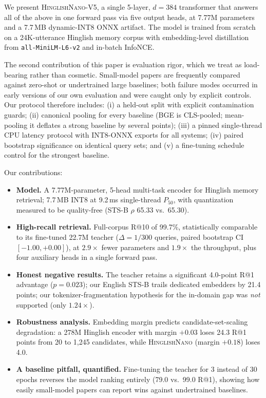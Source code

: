 \documentclass[11pt]{article}
\newcommand{\nano}{\textsc{HinglishNano}}
\begin{document}
We present \nano{}-V5, a single 5-layer, $d{=}384$ transformer that answers all of the above in one forward pass via five output heads, at 7.77M parameters and a 7.7\,MB dynamic-INT8 ONNX artifact. The model is trained from scratch on a 24K-utterance Hinglish memory corpus with embedding-level distillation from \texttt{all-MiniLM-L6-v2} and in-batch InfoNCE.

The second contribution of this paper is evaluation rigor, which we treat as load-bearing rather than cosmetic. Small-model papers are frequently compared against zero-shot or undertrained large baselines; both failure modes occurred in early versions of our own evaluation and were caught only by explicit controls. Our protocol therefore includes: (i) a held-out split with explicit contamination guards; (ii) canonical pooling for every baseline (BGE is CLS-pooled; mean-pooling it deflates a strong baseline by several points); (iii) a pinned single-thread CPU latency protocol with INT8-ONNX exports for all systems; (iv) paired bootstrap significance on identical query sets; and (v) a fine-tuning schedule control for the strongest baseline.

Our contributions:
\begin{itemize}\itemsep2pt
\item \textbf{Model.} A 7.77M-parameter, 5-head multi-task encoder for Hinglish memory retrieval; 7.7\,MB INT8 at 9.2\,ms single-thread $P_{50}$, with quantization measured to be quality-free (STS-B $\rho$ 65.33 vs.\ 65.30).
\item \textbf{High-recall retrieval.} Full-corpus R@10 of 99.7\%, statistically comparable to its fine-tuned 22.7M teacher ($\Delta = 1/300$ queries, paired bootstrap CI $[-1.00, +0.00]$), at $2.9\times$ fewer parameters and $1.9\times$ the throughput, plus four auxiliary heads in a single forward pass.
\item \textbf{Honest negative results.} The teacher retains a significant 4.0-point R@1 advantage ($p=0.023$); our English STS-B trails dedicated embedders by 21.4 points; our tokenizer-fragmentation hypothesis for the in-domain gap was \emph{not} supported (only $1.24\times$).
\item \textbf{Robustness analysis.} Embedding margin predicts candidate-set-scaling degradation: a 278M Hinglish encoder with margin $+0.03$ loses 24.3 R@1 points from 20 to 1{,}245 candidates, while \nano{} (margin $+0.18$) loses 4.0.
\item \textbf{A baseline pitfall, quantified.} Fine-tuning the teacher for 3 instead of 30 epochs reverses the model ranking entirely (79.0 vs.\ 99.0 R@1), showing how easily small-model papers can report wins against undertrained baselines.
\end{itemize}
\end{document}
